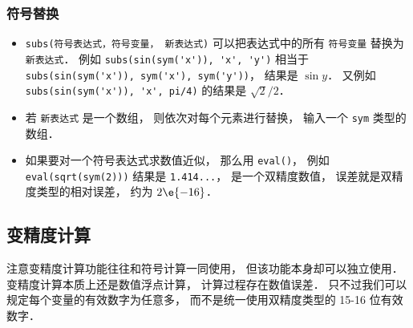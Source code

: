 \subsubsection{符号替换}
\begin{itemize}
\item \verb|subs(符号表达式，符号变量， 新表达式)| 可以把表达式中的所有 \verb|符号变量| 替换为 \verb|新表达式|． 例如 \verb|subs(sin(sym('x')), 'x', 'y')| 相当于 \verb|subs(sin(sym('x')), sym('x'), sym('y'))|， 结果是 $\sin y$． 又例如 \verb|subs(sin(sym('x')), 'x', pi/4)| 的结果是 $\sqrt 2/2$．
\item 若 \verb|新表达式| 是一个数组， 则依次对每个元素进行替换， 输入一个 \verb|sym| 类型的数组．
\item 如果要对一个符号表达式求数值近似， 那么用 \verb|eval()|， 例如 \verb|eval(sqrt(sym(2)))| 结果是 \verb|1.414...|， 是一个双精度数值， 误差就是双精度类型的相对误差， 约为 $2\e{-16}$．
\end{itemize}

\subsection{变精度计算}
注意变精度计算功能往往和符号计算一同使用， 但该功能本身却可以独立使用． 变精度计算本质上还是数值浮点计算， 计算过程存在数值误差． 只不过我们可以规定每个变量的有效数字为任意多， 而不是统一使用双精度类型的 15-16 位有效数字．

